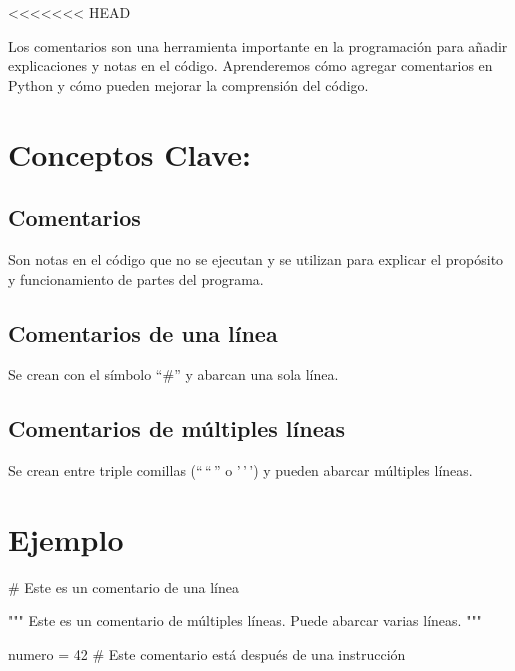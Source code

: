 \documentclass[
  a4paper,
  onepage,
  openany]{scrreprt}
\newenvironment{Shaded}{\begin{snugshade}}{\end{snugshade}}
\newcommand{\CommentTok}[1]{\textcolor[rgb]{0.37,0.37,0.37}{#1}}
\newcommand{\DecValTok}[1]{\textcolor[rgb]{0.68,0.00,0.00}{#1}}
\newcommand{\NormalTok}[1]{\textcolor[rgb]{0.00,0.23,0.31}{#1}}
\newcommand{\OperatorTok}[1]{\textcolor[rgb]{0.37,0.37,0.37}{#1}}
\begin{document}
\textless\textless\textless\textless\textless\textless\textless{} HEAD

Los comentarios son una herramienta importante en la programación para
añadir explicaciones y notas en el código. Aprenderemos cómo agregar
comentarios en Python y cómo pueden mejorar la comprensión del código.

\hypertarget{conceptos-clave-8}{%
\section{Conceptos Clave:}\label{conceptos-clave-8}}

\hypertarget{comentarios-1}{%
\subsection{Comentarios}\label{comentarios-1}}

Son notas en el código que no se ejecutan y se utilizan para explicar el
propósito y funcionamiento de partes del programa.

\hypertarget{comentarios-de-una-luxednea}{%
\subsection{Comentarios de una
línea}\label{comentarios-de-una-luxednea}}

Se crean con el símbolo ``\#'' y abarcan una sola línea.

\hypertarget{comentarios-de-muxfaltiples-luxedneas}{%
\subsection{Comentarios de múltiples
líneas}\label{comentarios-de-muxfaltiples-luxedneas}}

Se crean entre triple comillas (``\,``\,'' o '\,'\,') y pueden abarcar
múltiples líneas.

\hypertarget{ejemplo-8}{%
\section{Ejemplo}\label{ejemplo-8}}

\begin{Shaded}
\begin{Highlighting}[]
\CommentTok{\# Este es un comentario de una línea}

\CommentTok{"""}
\CommentTok{Este es un comentario}
\CommentTok{de múltiples líneas.}
\CommentTok{Puede abarcar varias líneas.}
\CommentTok{"""}

\NormalTok{numero }\OperatorTok{=} \DecValTok{42}  \CommentTok{\# Este comentario está después de una instrucción}
\end{Highlighting}
\end{Shaded}
\end{document}
